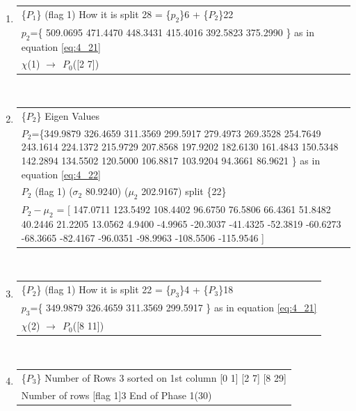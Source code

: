 \begin{center}
\begin{enumerate}
\item \begin{tabular}{ | p{15cm} | }\hline\{$P_{1}$\} 
            (flag 1) How it is split 28 = \{$p_{2}$\}6 + \{$P_{2}$\}22\\ 
$p_{2}$=\{ 509.0695 471.4470 448.3431 415.4016 392.5823 375.2990 \} as in equation \ref{eq:4_21} \\ 
            $\chi$(1) $\longrightarrow~~P_{0}$([2 7]) \\ 
\hline 
\end{tabular}\\ \vspace{3mm}

\item \begin{tabular}{ | p{15cm} | }\hline\{$P_{2}$\} Eigen Values \\ 
{$P_{2}$}=\{349.9879 326.4659 311.3569 299.5917 279.4973 269.3528 254.7649 243.1614 224.1372 215.9729 207.8568 197.9202 182.6130 161.4843 150.5348 142.2894 134.5502 120.5000 106.8817 103.9204 94.3661 86.9621 \} as in equation \ref{eq:4_22} \\ 
            $P_{2}$ (flag 1) ($\sigma_{2}$ 80.9240) ($\mu_{2}$ 202.9167) split \{22\} \\ 
$P_{2}-\mu_{2}$ = [ 147.0711 123.5492 108.4402 96.6750 76.5806 66.4361 51.8482 40.2446 21.2205 13.0562 4.9400 -4.9965 -20.3037 -41.4325 -52.3819 -60.6273 -68.3665 -82.4167 -96.0351 -98.9963 -108.5506 -115.9546 ]  \\ 
\hline 
\end{tabular}\\ \vspace{3mm}

\item \begin{tabular}{ | p{15cm} | }\hline\{$P_{2}$\} 
            (flag 1) How it is split 22 = \{$p_{3}$\}4 + \{$P_{3}$\}18\\ 
$p_{3}$=\{ 349.9879 326.4659 311.3569 299.5917 \} as in equation \ref{eq:4_21} \\ 
            $\chi$(2) $\longrightarrow~~P_{0}$([8 11]) \\ 
\hline 
\end{tabular}\\ \vspace{3mm}

\item \begin{tabular}{ | p{15cm} | }\hline\{$P_{3}$\} 
            Number of Rows 3
            sorted on 1st column
            [0  1]             [2  7]             [8  29] \\ 
            Number of rows [flag 1]3
            End of Phase 1(30) \\ 


\end{tabular}
\end{enumerate}
\end{center}

